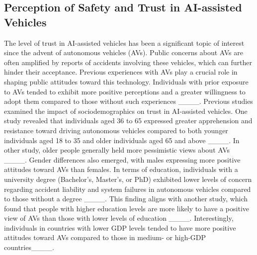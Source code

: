 \subsection{Perception of Safety and Trust in AI-assisted Vehicles}
The level of trust in AI-assisted vehicles has been a significant topic of interest since the advent of autonomous vehicles (AVs). Public concerns about AVs are often amplified by reports of accidents involving these vehicles, which can further hinder their acceptance. Previous experiences with AVs play a crucial role in shaping public attitudes toward this technology. Individuals with prior exposure to AVs tended to exhibit more positive perceptions and a greater willingness to adopt them compared to those without such experiences ____. Previous studies examined the impact of sociodemographics on trust in AI-assisted vehicles. One study revealed that individuals aged 36 to 65 expressed greater apprehension and resistance toward driving autonomous vehicles compared to both younger individuals aged 18 to 35 and older individuals aged 65 and above ____. In other study, older people generally held more pessimistic views about AVs ____. Gender differences also emerged, with males expressing more positive attitudes toward AVs than females.
In terms of education, individuals with a university degree (Bachelor's, Master's, or PhD) exhibited lower levels of concern regarding accident liability and system failures in autonomous vehicles compared to those without a degree ____. This finding aligns with another study, which found that people with higher education levels are more likely to have a positive view of AVs than those with lower levels of education ____. Interestingly, individuals in countries with lower GDP levels tended to have more positive attitudes toward AVs compared to those in medium- or high-GDP countries____.


